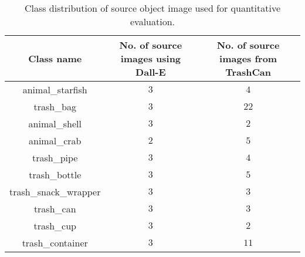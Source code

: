 \begin{table}[t]

\caption{Class distribution of source object image used for quantitative evaluation.}
\label{data_dist_quant}
\begin{center}
\begin{tabular}{ccc}
\hline
\toprule
    Class name & No. of source images using Dall-E & No. of source images from TrashCan\\
    \midrule
     animal\_starfish & $3$ & $4$ \\
     trash\_bag & $3$ & $22$\\
     animal\_shell & $3$ & $2$\\
     animal\_crab & $2$ & $5$ \\
     trash\_pipe & $3$ & $4$\\
     trash\_bottle & $3$ &$5$\\
     trash\_snack\_wrapper & $3$ & $3$\\
     trash\_can & $3$ & $3$ \\
     trash\_cup & $3$ & $2$\\
     trash\_container & $3$ & $11$\\
     
\bottomrule
\end{tabular}
\end{center}
\end{table}
